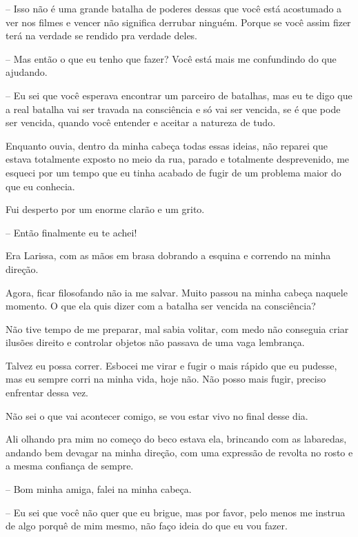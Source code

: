 -- Isso não é uma grande batalha de poderes dessas que você está acostumado a ver nos filmes e vencer não significa derrubar ninguém. Porque se você assim fizer terá na verdade se rendido pra verdade deles.

-- Mas então o que eu tenho que fazer? Você está mais me confundindo do que ajudando.

-- Eu sei que você esperava encontrar um parceiro de batalhas, mas eu te digo que a real batalha vai ser travada na consciência e só vai ser vencida, se é que pode ser vencida, quando você entender e aceitar a natureza de tudo.

Enquanto ouvia, dentro da minha cabeça todas essas ideias, não reparei que estava totalmente exposto no meio da rua, parado e totalmente desprevenido, me esqueci por um tempo que eu tinha acabado de fugir de um problema maior do que eu conhecia.

Fui desperto por um enorme clarão e um grito.

-- Então finalmente eu te achei!

Era Larissa, com as mãos em brasa dobrando a esquina e correndo na minha direção.

Agora, ficar filosofando não ia me salvar. Muito passou na minha cabeça naquele momento. O que ela quis dizer com a batalha ser vencida na consciência?

Não tive tempo de me preparar, mal sabia volitar, com medo não conseguia criar ilusões direito e controlar objetos não passava de uma vaga lembrança.

Talvez eu possa correr. Esbocei me virar e fugir o mais rápido que eu pudesse, mas eu sempre corri na minha vida, hoje não. Não posso mais fugir, preciso enfrentar dessa vez.

Não sei o que vai acontecer comigo, se vou estar vivo no final desse dia.

Ali olhando pra mim no começo do beco estava ela, brincando com as labaredas, andando bem devagar na minha direção, com uma expressão de revolta no rosto e a mesma confiança de sempre.

-- Bom minha amiga, falei na minha cabeça.

-- Eu sei que você não quer que eu brigue, mas por favor, pelo menos me instrua de algo porquê de mim mesmo, não faço ideia do que eu vou fazer.

